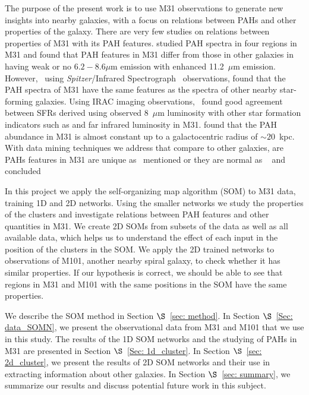 The purpose of the present work is to use M31 observations to generate new insights into nearby galaxies, with a focus on relations between PAHs and other properties of the galaxy.
There are very few studies on relations between properties of M31 with its PAH features. %
\cite{Cesarsky98} studied PAH spectra in four regions in M31 and found that PAH features in M31 differ from those in other galaxies in having weak or no $6.2 - 8.6\mu$m emission with enhanced 11.2~$\mu$m emission. 
However,~\cite{Dim15} using {\it Spitzer}/Infrared Spectrograph~\citealt[IRS,][]{Houck04b} observations, found that the PAH spectra of M31 have the same features as the spectra of other nearby star-forming galaxies.
Using IRAC imaging observations,~\cite{Barmby06} found good agreement between SFRs derived using observed 8~$\mu$m luminosity with other 
star formation indicators such as \halpha and far infrared luminosity in M31.
\cite{Draine14} found that the PAH abundance in M31 is almost constant up to a galactocentric radius of $\sim 20$~kpc.
With data mining techniques we address that
compare to other galaxies, are PAHs features in M31 are unique as~\cite{Cesarsky98} mentioned or they are normal as ~\cite{Dim15} and \cite{Draine14} concluded


In this project we apply the self-organizing map algorithm (SOM) to M31 data, training 1D and 2D networks.
Using the smaller networks we study the properties of the clusters and investigate relations between PAH features and other quantities in M31.
We create 2D SOMs from subsets of the data as well as all available data, which helps us to understand the effect of each input in the position of the clusters in the SOM.
We apply the 2D trained networks to  observations of M101, another nearby spiral  galaxy, to check whether it has similar properties.
If our hypothesis is correct, we should be able to see that regions in M31 and M101 with the same positions in the SOM have the same properties.


We describe the SOM method in Section $\S$~\ref{sec: method}. 
In Section $\S$~\ref{Sec: data_SOMN}, we present the observational data from M31 and M101 that we use in this study.
The results of the 1D SOM networks and the studying of PAHs in M31 are presented in Section $\S$~\ref{Sec: 1d_cluster}.
In Section $\S$~\ref{sec: 2d_cluster}, we present the results of 2D SOM networks and their use in extracting information about other galaxies.
In Section $\S$~\ref{sec: summary}, we summarize our results and discuss potential future work in this subject.